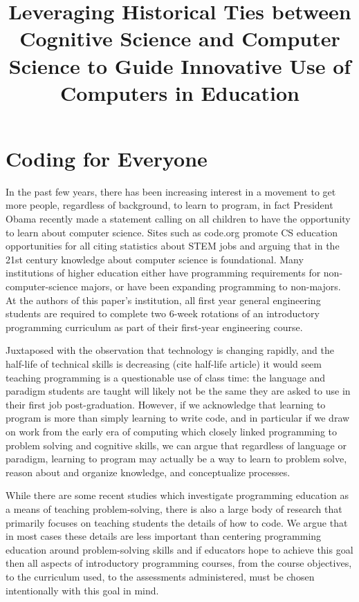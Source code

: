 \documentclass[12pt]{article}
\title{\large \textbf{Leveraging Historical Ties between Cognitive Science and
  Computer Science to Guide Innovative Use of Computers in Education}}
\author{}
\date{}
\begin{document}
\raggedright
\maketitle
\thispagestyle{empty}
\pagestyle{empty}

\section{Coding for Everyone}
In the past few years, there has been increasing interest in a
movement to get more people, regardless of background, to learn to
program, in fact President Obama recently made a statement calling on
all children to have the opportunity to learn about computer
science\autocite{whitehouse_computer_2016}. Sites such as code.org
promote CS education opportunities for all citing statistics about
STEM jobs and arguing that in the 21st century knowledge about
computer science is foundational\autocite{code.org_every_2016}. Many
institutions of higher education either have programming requirements
for non-computer-science majors, or have been expanding programming to
non-majors\autocite{rich_cs1_2004,forte_motivation_2005,guzdial_design_2005}. At
the authors of this paper's institution, all first year general
engineering students are required to complete two 6-week rotations of
an introductory programming curriculum as part of their first-year
engineering course.

Juxtaposed with the observation that technology is changing rapidly,
and the half-life of technical skills is decreasing (cite half-life
article) it would seem teaching programming is a questionable use of
class time: the language and paradigm students are taught will likely
not be the same they are asked to use in their first job
post-graduation. However, if we acknowledge that learning to program
is more than simply learning to write code, and in particular if we
draw on work from the early era of computing which closely linked
programming to problem solving and cognitive skills, we can argue that
regardless of language or paradigm, learning to program may actually
be a way to learn to problem solve, reason about and organize
knowledge, and conceptualize processes.

While there are some recent studies which investigate programming
education as a means of teaching problem-solving, there is also a
large body of research that primarily focuses on teaching students the
details of how to code. We argue that in most cases these details are
less important than centering programming education around
problem-solving skills and if educators hope to achieve this goal then
all aspects of introductory programming courses, from the course
objectives, to the curriculum used, to the assessments administered,
must be chosen intentionally with this goal in mind.
\end{document}
